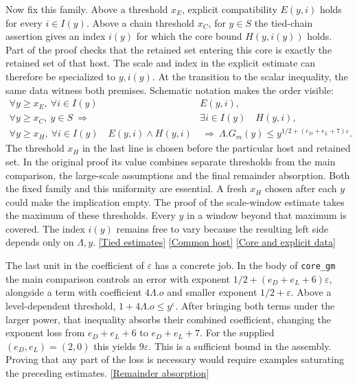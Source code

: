 \documentclass[12pt,letterpaper]{article}
\begin{document}
Now fix this family. Above a threshold \(x_E\), explicit compatibility \(E(y,i)\) holds for every \(i\in I(y)\). Above a chain threshold \(x_C\), for \(y\in S\) the tied-chain assertion gives an index \(i(y)\) for which the core bound \(H(y,i(y))\) holds. Part of the proof checks that the retained set entering this core is exactly the retained set of that host. The scale and index in the explicit estimate can therefore be specialized to \(y,i(y)\). At the transition to the scalar inequality, the same data witness both premises. Schematic notation makes the order visible:
\[
 \begin{aligned}
 \forall y\ge x_E,\ \forall i\in I(y)\quad &E(y,i),\\
 \forall y\ge x_C,\ y\in S\ \Longrightarrow\
             &\exists i\in I(y)\quad H(y,i),\\
 \forall y\ge x_H,\ \forall i\in I(y)\quad
       E(y,i)\land H(y,i)&\ \Longrightarrow\ 
       \Lambda.G_m(y)\le y^{1/2+(e_D+e_L+7)\varepsilon}.
 \end{aligned}
\]
The threshold \(x_H\) in the last line is chosen before the particular host and retained set. In the original proof its value combines separate thresholds from the main comparison, the large-scale assumptions and the final remainder absorption. Both the fixed family and this uniformity are essential. A fresh \(x_H\) chosen after each \(y\) could make the implication empty. The proof of the scale-window estimate takes the maximum of these thresholds. Every \(y\) in a window beyond that maximum is covered. The index \(i(y)\) remains free to vary because the resulting left side depends only on \(\Lambda,y\). \href{https://github.com/nousentllc/riemann-hypothesis/blob/40e56bab026552e089d7afcfeff08d2defb9c005/src/Development/AutomorphicArithmetic/PrimitiveCosets/LevelGmLeOnFamilyScales.lean#L13-L30}{\textsf{[Tied estimates]}} \href{https://github.com/nousentllc/riemann-hypothesis/blob/40e56bab026552e089d7afcfeff08d2defb9c005/src/Development/AutomorphicArithmetic/PrimitiveCosets/WindowInequalityOfArtinInputs.lean#L11-L25}{\textsf{[Common host]}} \href{https://github.com/nousentllc/riemann-hypothesis/blob/40e56bab026552e089d7afcfeff08d2defb9c005/src/Development/AutomorphicArithmetic/PrimitiveCosets/CoreGm.lean#L12-L15}{\textsf{[Core and explicit data]}}

The last unit in the coefficient of \(\varepsilon\) has a concrete job. In the body of \texttt{core\_gm} the main comparison controls an error with exponent \(1/2+(e_D+e_L+6)\varepsilon\), alongside a term with coefficient \(4\Lambda.o\) and smaller exponent \(1/2+\varepsilon\). Above a level-dependent threshold, \(1+4\Lambda.o\le y^\varepsilon\). After bringing both terms under the larger power, that inequality absorbs their combined coefficient, changing the exponent loss from \(e_D+e_L+6\) to \(e_D+e_L+7\). For the supplied \((e_D,e_L)=(2,0)\) this yields \(9\varepsilon\). This is a sufficient bound in the assembly. Proving that any part of the loss is necessary would require examples saturating the preceding estimates. \href{https://github.com/nousentllc/riemann-hypothesis/blob/40e56bab026552e089d7afcfeff08d2defb9c005/src/Development/AutomorphicArithmetic/PrimitiveCosets/CoreGm.lean#L48-L74}{\textsf{[Remainder absorption]}}
\end{document}
